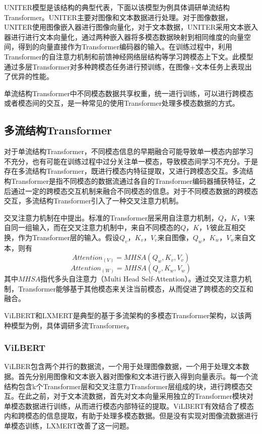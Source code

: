 \documentclass[journal]{IEEEtran}
\begin{document}
UNITER模型是该结构的典型代表，下面以该模型为例具体调研单流结构Transformer。UNITER\cite{2020UNITER}主要对图像和文本数据进行处理。对于图像数据，UNITER使用图像嵌入器进行图像向量化，对于文本数据，UNITER采用文本嵌入器进行进行文本向量化，通过两种嵌入器将多模态数据映射到相同维度的向量空间，得到的向量直接作为Transformer编码器的输入。在训练过程中，利用Transformer的自注意力机制和前馈神经网络层结构等学习跨模态上下文。此模型通过多层Transformer对多种跨模态任务进行预训练，在图像+文本任务上表现出了优异的性能。

单流结构Transformer中不同模态数据共享权重，统一进行训练，可以进行跨模态或者模态间的交互，是一种常见的使用Transformer处理多模态数据的方式。

\subsection{多流结构Transformer}
对于单流结构Transformer，不同模态信息的早期融合可能导致单一模态内部学习不充分，也有可能在训练过程中过分关注单一模态，导致模态间学习不充分。于是存在多流结构Transformer，既进行模态内特征提取，又进行跨模态交互。多流结构Transformer是指不同模态的数据流通过各自的Transformer编码器捕获特征，之后通过一定的跨模态交互机制来融合不同模态的信息。对于不同模态数据的跨模态交互，多流结构Transformer引入了一种交叉注意力机制。

交叉注意力机制在\cite{lu2019vilbert}中提出。标准的Transformer层采用自注意力机制，$Q$，$K$，$V$来自同一组输入，而在交叉注意力机制中，来自不同模态的$Q$，$K$，$V$彼此互相交换，作为Transformer层的输入。假设$Q_v$，$K_v$，$V_v$来自图像，$Q_w$，$K_w$，$V_w$来自文本，则有
$$Attention_{(V)} = MHSA(Q_w,K_v,V_v)$$
$$Attention_{(W)} = MHSA(Q_v,K_w,V_w)$$
其中$MHSA$指代多头自注意力（Multi Head Self-Attention）。通过交叉注意力机制，Transformer能够基于其他模态来关注当前模态，从而促进了跨模态的交互和融合。

ViLBERT和LXMERT是典型的基于多流架构的多模态Transformer架构，以该两种模型为例，具体调研多流Transformer。

\subsubsection{ViLBERT}
ViLBER\cite{lu2019vilbert}包含两个并行的数据流，一个用于处理图像数据，一个用于处理文本数据。首先分别用图像和文本嵌入器对图像和文本进行嵌入得到向量表示。每一个流结构包含k个Transformer层和交叉注意力Transformer层组成的块，进行跨模态交互。在此之前，对于文本流数据，首先对文本向量采用独立的Transformer模块对单模态数据进行训练，从而进行模态内部特征的提取。ViLBERT有效结合了模态内和跨模态的信息提取，有助于处理多模态数据。但是没有实现对图像流数据进行单模态训练，LXMERT改善了这一问题。
\end{document}
